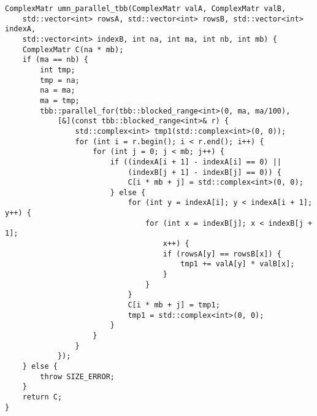 \documentclass{report}
\begin{document}
\begin{lstlisting}
ComplexMatr umn_parallel_tbb(ComplexMatr valA, ComplexMatr valB,
    std::vector<int> rowsA, std::vector<int> rowsB, std::vector<int> indexA,
    std::vector<int> indexB, int na, int ma, int nb, int mb) {
    ComplexMatr C(na * mb);
    if (ma == nb) {
        int tmp;
        tmp = na;
        na = ma;
        ma = tmp;
        tbb::parallel_for(tbb::blocked_range<int>(0, ma, ma/100),
            [&](const tbb::blocked_range<int>& r) {
                std::complex<int> tmp1(std::complex<int>(0, 0));
                for (int i = r.begin(); i < r.end(); i++) {
                    for (int j = 0; j < mb; j++) {
                        if ((indexA[i + 1] - indexA[i] == 0) ||
                            (indexB[j + 1] - indexB[j] == 0)) {
                            C[i * mb + j] = std::complex<int>(0, 0);
                        } else {
                            for (int y = indexA[i]; y < indexA[i + 1]; y++) {
                                for (int x = indexB[j]; x < indexB[j + 1];
                                    x++) {
                                    if (rowsA[y] == rowsB[x]) {
                                        tmp1 += valA[y] * valB[x];
                                    }
                                }
                            }
                            C[i * mb + j] = tmp1;
                            tmp1 = std::complex<int>(0, 0);
                        }
                    }
                }
            });
    } else {
        throw SIZE_ERROR;
    }
    return C;
}


\end{lstlisting}
\end{document}
